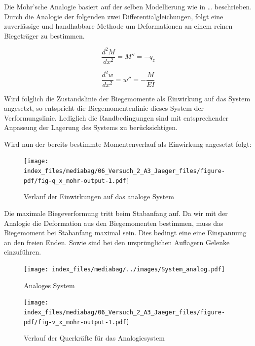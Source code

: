 \documentclass[
  12pt,
  letterpaper,
  egregdoesnotlikesansseriftitles]{scrreprt}
\begin{document}
Die Mohr'sche Analogie basiert auf der selben Modellierung wie in
\ldots{} beschrieben. Durch die Analogie der folgenden zwei
Differentialgleichungen, folgt eine zuverlässige und handhabbare Methode
um Deformationen an einem reinen Biegeträger zu bestimmen.

\[
\frac{d^2M}{dx^2} = M'' = -q_z
\]

\[
\frac{d^2w}{dx^2} = w'' = -\frac{M}{EI}
\]

Wird folglich die Zustandslinie der Biegemomente als Einwirkung auf das
System angesetzt, so entspricht die Biegemomentenlinie dieses System der
Verformungslinie. Lediglich die Randbedingungen sind mit entsprechender
Anpassung der Lagerung des Systems zu berücksichtigen.

Wird nun der bereits bestimmte Momentenverlauf als Einwirkung angesetzt
folgt:

\begin{figure}[H]

{\centering \texttt{[image: index\_files/mediabag/06\_Versuch\_2\_A3\_Jaeger\_files/figure-pdf/fig-q\_x\_mohr-output-1.pdf]}

}

\caption{\label{fig-q_x_mohr}Verlauf der Einwirkungen auf das analoge
System}

\end{figure}

Die maximale Biegeverformung tritt beim Stabanfang auf. Da wir mit der
Analogie die Deformation aus den Biegemomenten bestimmen, muss das
Biegemoment bei Stabanfang maximal sein. Dies bedingt eine eine
Einspannung an den freien Enden. Sowie sind bei den ursprünglichen
Auflagern Gelenke einzuführen.

\begin{figure}[H]

{\centering \texttt{[image: index\_files/mediabag/../images/System\_analog.pdf]}

}

\caption{\label{fig-system_analog}Analoges System}

\end{figure}

\begin{figure}[H]

{\centering \texttt{[image: index\_files/mediabag/06\_Versuch\_2\_A3\_Jaeger\_files/figure-pdf/fig-v\_x\_mohr-output-1.pdf]}

}

\caption{\label{fig-v_x_mohr}Verlauf der Querkräfte für das
Analogiesystem}

\end{figure}
\end{document}
